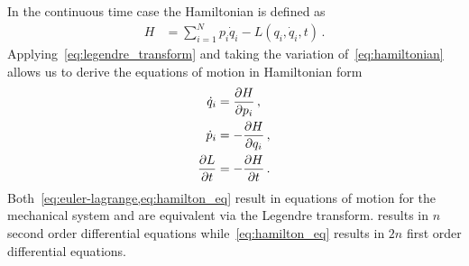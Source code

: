 \documentclass[letterpaper, paper,11pt]{AAS}		%
\begin{document}
In the continuous time case the Hamiltonian is defined as
\begin{align}\label{eq:hamiltonian}
	H &= \sum_{i = 1}^N p_i \dot{q}_i - L \left( q_i,\dot{q}_i, t \right) \, .
\end{align}
Applying~\cref{eq:legendre_transform} and taking the variation of~\cref{eq:hamiltonian} allows us to derive the equations of motion in Hamiltonian form
\begin{subequations}\label{eq:hamilton_eq}
\begin{align}
	\dot{q}_i &= \frac{\partial H}{\partial p_i} \, ,\\
	\dot{p}_i &= - \frac{\partial H}{\partial q_i} \, , \\
	\frac{\partial L}{\partial t} &= -\frac{\partial H}{\partial t} \, .
\end{align}
\end{subequations}
Both~\cref{eq:euler-lagrange,eq:hamilton_eq} result in equations of motion for the mechanical system and are equivalent via the Legendre transform.
 results in \( n \) second order differential equations while~\cref{eq:hamilton_eq} results in \( 2n \) first order differential equations.
\end{document}
